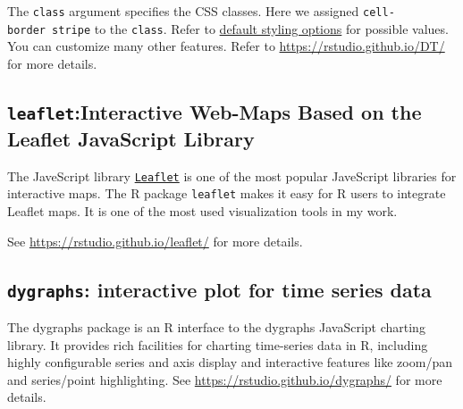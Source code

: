 \documentclass[]{book}
\newenvironment{Shaded}{\begin{snugshade}}{\end{snugshade}}
\newcommand{\KeywordTok}[1]{\textcolor[rgb]{0.13,0.29,0.53}{\textbf{{#1}}}}
\newcommand{\DataTypeTok}[1]{\textcolor[rgb]{0.13,0.29,0.53}{{#1}}}
\newcommand{\FloatTok}[1]{\textcolor[rgb]{0.00,0.00,0.81}{{#1}}}
\newcommand{\StringTok}[1]{\textcolor[rgb]{0.31,0.60,0.02}{{#1}}}
\newcommand{\NormalTok}[1]{{#1}}
\theoremstyle{definition}
\theoremstyle{definition}
\theoremstyle{remark}
\begin{document}
\hypertarget{htmlwidget-be43731d28a54e5071c9}{}

The \texttt{class} argument specifies the CSS classes. Here we assigned
\texttt{cell-border\ stripe} to the \texttt{class}. Refer to
\href{https://datatables.net/manual/styling/classes}{default styling
options} for possible values. You can customize many other features.
Refer to \url{https://rstudio.github.io/DT/} for more details.

\subsection{\texorpdfstring{\texttt{leaflet}:Interactive Web-Maps Based
on the Leaflet JavaScript
Library}{leaflet:Interactive Web-Maps Based on the Leaflet JavaScript Library}}\label{leafletinteractive-web-maps-based-on-the-leaflet-javascript-library}

The JaveScript library \href{http://leafletjs.com/}{\texttt{Leaflet}} is
one of the most popular JaveScript libraries for interactive maps. The R
package \texttt{leaflet} makes it easy for R users to integrate Leaflet
maps. It is one of the most used visualization tools in my work.

\begin{Shaded}
\end{Shaded}

\hypertarget{htmlwidget-dfb2024d815a76953952}{}

See \url{https://rstudio.github.io/leaflet/} for more details.

\subsection{\texorpdfstring{\texttt{dygraphs}: interactive plot for time
series
data}{dygraphs: interactive plot for time series data}}\label{dygraphs-interactive-plot-for-time-series-data}

The dygraphs package is an R interface to the dygraphs JavaScript
charting library. It provides rich facilities for charting time-series
data in R, including highly configurable series and axis display and
interactive features like zoom/pan and series/point highlighting. See
\url{https://rstudio.github.io/dygraphs/} for more details.
\end{document}
